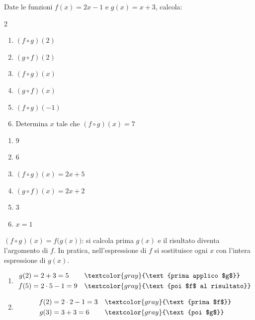 
\begin{question}[ID=1.1, subtitle={Composizione di funzioni}, difficulty=facile, tags={funzioni, composizione}]
Date le funzioni $f(x)=2x-1$ e $g(x)=x+3$, calcola:
\begin{multicols}{2}
\begin{enumerate}[leftmargin=3.2cm]
    \item $(f\circ g)(2)$
    \item $(g\circ f)(2)$
    \item $(f\circ g)(x)$
    \item $(g\circ f)(x)$
    \item $(f\circ g)(-1)$
    \item Determina $x$ tale che $(f\circ g)(x)=7$
\end{enumerate}
\end{multicols}
\begin{solution}
\begin{enumerate}
    \item $9$
    \item $6$
    \item $(f\circ g)(x)=2x+5$
    \item $(g\circ f)(x)=2x+2$
    \item $3$
    \item $x=1$
\end{enumerate}
\end{solution}
\begin{explanation}
$(f\circ g)(x)=f\big(g(x)\big)$: si calcola prima $g(x)$ e il risultato diventa l'argomento di $f$. In pratica, nell'espressione di $f$ si sostituisce ogni $x$ con l'intera espressione di $g(x)$.
\begin{enumerate}
    \item \[\begin{aligned}
    g(2) &= 2+3=5 && \textcolor{gray}{\text{prima applico $g$}}\\
    f(5) &= 2\cdot5-1=9 && \textcolor{gray}{\text{poi $f$ al risultato}}
    \end{aligned}\]
    \item \[\begin{aligned}
    f(2) &= 2\cdot2-1=3 && \textcolor{gray}{\text{prima $f$}}\\
    g(3) &= 3+3=6 && \textcolor{gray}{\text{poi $g$}}
    \end{aligned}\]

\end{enumerate}
\end{explanation}
\end{question}
